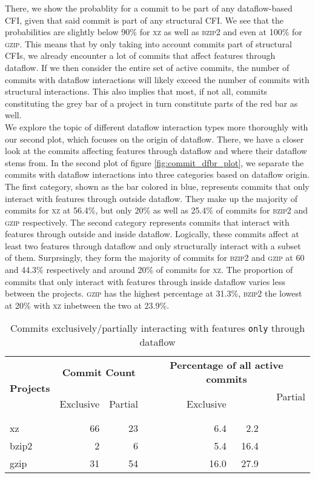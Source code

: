 There, we show the probablity for a commit to be part of any dataflow-based CFI, given that said commit is part of any structural CFI.
We see that the probabilities are slightly below 90\% for \textsc{xz} as well as \textsc{bzip2} and even at 100\% for \textsc{gzip}.
This means that by only taking into account commits part of structural CFIs, we already encounter a lot of commits that affect features through dataflow.
If we then consider the entire set of active commits, the number of commits with dataflow interactions will likely exceed the number of commits with structural interactions.
This also implies that most, if not all, commits constituting the grey bar of a project in turn constitute parts of the red bar as well. \\
We explore the topic of different dataflow interaction types more thoroughly with our second plot, which focuses on the \textsf{origin} of dataflow.
There, we have a closer look at the commits affecting features through dataflow and where their dataflow stems from.
In the second plot of figure \ref{fig:commit_dfbr_plot}, we separate the commits with dataflow interactions into three categories based on dataflow origin.
The first category, shown as the bar colored in blue, represents commits that only interact with features through outside dataflow.
They make up the majority of commits for \textsc{xz} at 56.4\%, but only 20\% as well as 25.4\% of commits for \textsc{bzip2} and \textsc{gzip} respectively.
The second category represents commits that interact with features through outside and inside dataflow.
Logically, these commits affect at least two features through dataflow and only structurally interact with a subset of them.
Surprsingly, they form the majority of commits for \textsc{bzip2} and \textsc{gzip} at 60 and 44.3\% respectively and around 20\% of commits for \textsc{xz}.
The proportion of commits that only interact with features through inside dataflow varies less between the projects.
\textsc{gzip} has the highest percentage at 31.3\%, \textsc{bzip2} the lowest at 20\% with \textsc{xz} inbetween the two at 23.9\%. \\
\begin{table}[t]
\caption{Commits exclusively/partially interacting with features \texttt{only} through dataflow}
\label{tab:commit_exclusive_and_partial_dfbr_table}
\centering
  \begin{tabular}{l*4{r}}
    \toprule
    \multirow{2}{*}{\textbf{Projects}} &
      \multicolumn{2}{c}{\textbf{Commit Count}} &
      \multicolumn{2}{c}{\textbf{Percentage of all active commits}} \\
      & {Exclusive} & {Partial} & {\ \ \ \ \ \ \ \ Exclusive} & {Partial \ \ \ \ \ \ \ \ } \\
      \midrule
    xz & 66 & 23 & 6.4 & 2.2 \ \ \ \ \ \ \ \ \ \\
    bzip2 & 2 & 6 & 5.4 & 16.4 \ \ \ \ \ \ \ \ \ \\
    gzip & 31 & 54 & 16.0 & 27.9 \ \ \ \ \ \ \ \ \ \\
    \bottomrule
  \end{tabular}
\end{table}
